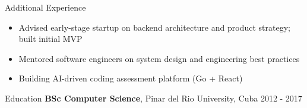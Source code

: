 \documentclass{resume}
\begin{document}
\begin{rSection}{Additional Experience}
\begin{itemize}
    \item Advised early-stage startup on backend architecture and product strategy; built initial MVP
    \item Mentored software engineers on system design and engineering best practices
    \item Building AI-driven coding assessment platform (Go + React)
\end{itemize}
\end{rSection}


\begin{rSection}{Education}
{\bf BSc Computer Science}, Pinar del Rio University, Cuba \hfill 2012 - 2017
\end{rSection}
\end{document}
